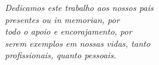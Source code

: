 \vfill

\begin{flushright}

    \hfill \textit{Dedicamos este trabalho aos nossos pais\\
    presentes ou \emph{in memorian}, por\\
    todo o apoio e encorajamento, por\\
    serem exemplos em nossas vidas, tanto\\
    profissionais, quanto pessoais.}

\end{flushright}

\vspace*{1cm}

\clearpage
